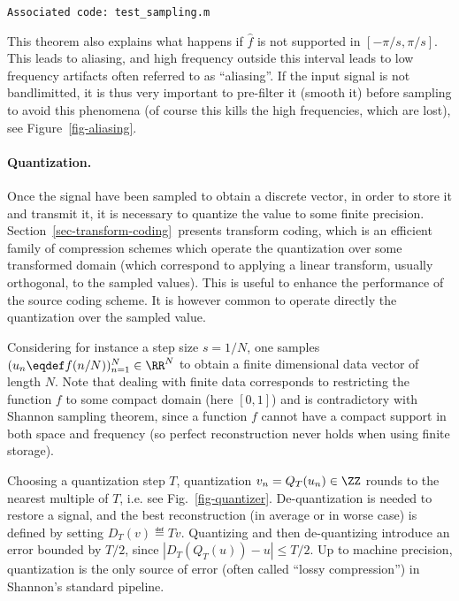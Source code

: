 \texttt{Associated code: test\_sampling.m}




This theorem also explains what happens if $\hat f$ is not supported in $[-\pi/s,\pi/s]$. This leads to aliasing, and high frequency outside this interval leads to low frequency artifacts often referred to as ``aliasing''. If the input signal is not bandlimitted, it is thus very important to pre-filter it (smooth it) before sampling to avoid this phenomena (of course this kills the high frequencies, which are lost), see Figure~\ref{fig-aliasing}. 


\paragraph{Quantization.}

Once the signal have been sampled to obtain a discrete vector, in order to store it and transmit it, it is necessary to quantize the value to some finite precision. 
% 
Section~\ref{sec-transform-coding} presents transform coding, which is an efficient family of compression schemes which operate the quantization over some transformed domain (which correspond to applying a linear transform, usually orthogonal, to the sampled values). This is useful to enhance the performance of the source coding scheme. It is however common to operate directly the quantization over the sampled value. 

Considering for instance a step size $s=1/N$, one samples $(u_n \eqdef f(n/N))_{n=1}^{N} \in \RR^N$ to obtain a finite dimensional data vector of length $N$. Note that dealing with finite data corresponds to restricting the function $f$ to some compact domain (here $[0,1]$) and is contradictory with Shannon sampling theorem, since a function $f$ cannot have a compact support in both space and frequency (so perfect reconstruction never holds when using finite storage).


Choosing a quantization step $T$, quantization $v_n = Q_T(u_n) \in \ZZ$ rounds to the nearest multiple of $T$, i.e. 
see Fig.~\ref{fig-quantizer}. De-quantization is needed to restore a signal, and the best reconstruction (in average or in worse case) is defined by setting $D_T(v) \eqdef T v$. Quantizing and then de-quantizing introduce an error bounded by $T/2$, since $|D_T(Q_T(u))-u| \leq T/2$. 
%
Up to machine precision, quantization is the only source of error (often called ``lossy compression'') in Shannon's standard pipeline.


